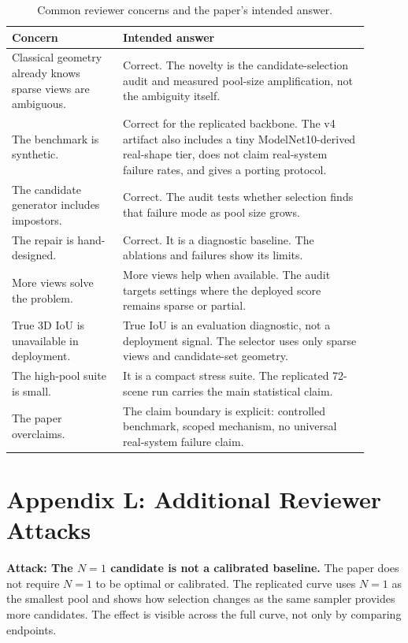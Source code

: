 \documentclass{article}
\begin{document}
\begin{table}[t]
\centering
\caption{Common reviewer concerns and the paper's intended answer.}
\label{tab:reviewer}
\begin{tabular}{p{0.28\linewidth}p{0.62\linewidth}}
\toprule
Concern & Intended answer \\
\midrule
Classical geometry already knows sparse views are ambiguous. &
Correct. The novelty is the candidate-selection audit and measured pool-size
amplification, not the ambiguity itself. \\
The benchmark is synthetic. &
Correct for the replicated backbone. The v4 artifact also includes a tiny
ModelNet10-derived real-shape tier, does not claim real-system failure rates,
and gives a porting protocol. \\
The candidate generator includes impostors. &
Correct. The audit tests whether selection finds that failure mode as pool
size grows. \\
The repair is hand-designed. &
Correct. It is a diagnostic baseline. The ablations and failures show its
limits. \\
More views solve the problem. &
More views help when available. The audit targets settings where the deployed
score remains sparse or partial. \\
True 3D IoU is unavailable in deployment. &
True IoU is an evaluation diagnostic, not a deployment signal. The selector
uses only sparse views and candidate-set geometry. \\
The high-pool suite is small. &
It is a compact stress suite. The replicated 72-scene run carries the main
statistical claim. \\
The paper overclaims. &
The claim boundary is explicit: controlled benchmark, scoped mechanism, no
universal real-system failure claim. \\
\bottomrule
\end{tabular}
\end{table}

\section{Appendix L: Additional Reviewer Attacks}

\textbf{Attack: The $N=1$ candidate is not a calibrated baseline.}
The paper does not require $N=1$ to be optimal or calibrated. The replicated
curve uses $N=1$ as the smallest pool and shows how selection changes as the
same sampler provides more candidates. The effect is visible across the full
curve, not only by comparing endpoints.
\end{document}
